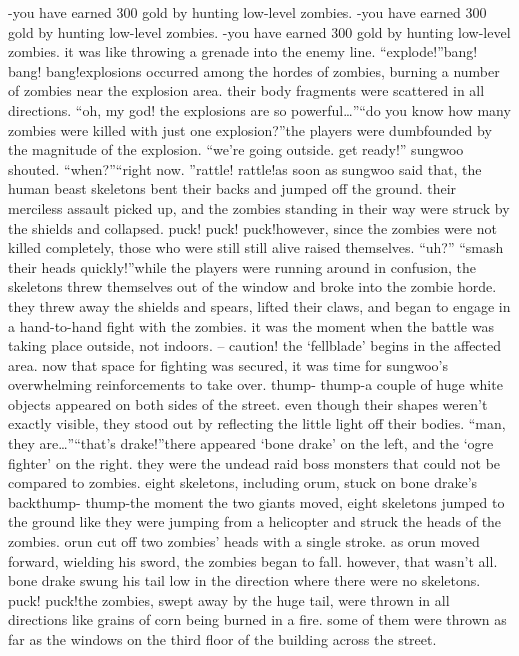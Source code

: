 -you have earned 300 gold by hunting low-level zombies.
-you have earned 300 gold by hunting low-level zombies.
-you have earned 300 gold by hunting low-level zombies.
it was like throwing a grenade into the enemy line.
“explode!”bang! bang! bang!explosions occurred among the hordes of zombies, burning a number of zombies near the explosion area.
 their body fragments were scattered in all directions.
“oh, my god! the explosions are so powerful…”“do you know how many zombies were killed with just one explosion?”the players were dumbfounded by the magnitude of the explosion.
“we’re going outside.
 get ready!” sungwoo shouted.
“when?”“right now.
”rattle! rattle!as soon as sungwoo said that, the human beast skeletons bent their backs and jumped off the ground.
 their merciless assault picked up, and the zombies standing in their way were struck by the shields and collapsed.
puck! puck! puck!however, since the zombies were not killed completely, those who were still still alive raised themselves.
“uh?”
“smash their heads quickly!”while the players were running around in confusion, the skeletons threw themselves out of the window and broke into the zombie horde.
they threw away the shields and spears, lifted their claws, and began to engage in a hand-to-hand fight with the zombies.
 it was the moment when the battle was taking place outside, not indoors.
– caution! the ‘fellblade’ begins in the affected area.
now that space for fighting was secured, it was time for sungwoo’s overwhelming reinforcements to take over.
thump- thump-a couple of huge white objects appeared on both sides of the street.
 even though their shapes weren’t exactly visible, they stood out by reflecting the little light off their bodies.
“man, they are…”“that’s drake!”there appeared ‘bone drake’ on the left, and the ‘ogre fighter’ on the right.
 they were the undead raid boss monsters that could not be compared to zombies.
eight skeletons, including orum, stuck on bone drake’s backthump- thump-the moment the two giants moved, eight skeletons jumped to the ground like they were jumping from a helicopter and struck the heads of the zombies.
orun cut off two zombies’ heads with a single stroke.
as orun moved forward, wielding his sword, the zombies began to fall.
however, that wasn’t all.
 bone drake swung his tail low in the direction where there were no skeletons.
puck! puck!the zombies, swept away by the huge tail, were thrown in all directions like grains of corn being burned in a fire.
 some of them were thrown as far as the windows on the third floor of the building across the street.
